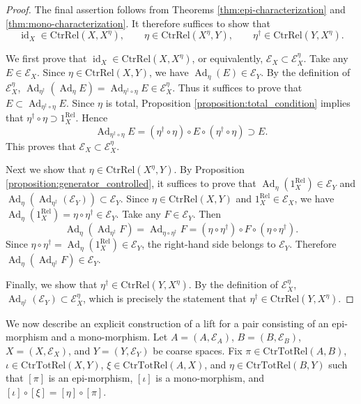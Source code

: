 \documentclass[12pt, a4paper]{amsart}
\theoremstyle{definition}
\newcommand{\Ad}{\mathop{\mathrm{Ad}}\nolimits}
\newcommand{\id}{\mathop{\mathrm{id}}\nolimits}
\newcommand{\Rel}{\mathrm{Rel}}
\newcommand{\CtrTotRel}{\mathrm{CtrTotRel}}
\newcommand{\CtrRel}{\mathrm{CtrRel}}
\begin{document}
\begin{proof}
The final assertion follows from
Theorems \ref{thm:epi-characterization}
and
\ref{thm:mono-characterization}.
It therefore suffices to show that
\[
\id_X \in \CtrRel(X,X^\eta),
\qquad
\eta \in \CtrRel(X^\eta,Y),
\qquad
\eta^\dagger \in \CtrRel(Y,X^\eta).
\]

We first prove that
$\id_X \in \CtrRel(X,X^\eta)$,
or equivalently,
$\mathcal{E}_X \subset \mathcal{E}_X^\eta$.
Take any
$E\in\mathcal{E}_X$.
Since
$\eta\in\CtrRel(X,Y)$,
we have
$\Ad_\eta(E)\in\mathcal{E}_Y$.
By the definition of
$\mathcal{E}_X^\eta$,
$\Ad_{\eta^\dagger}(\Ad_\eta E)
=
\Ad_{\eta^\dagger\circ\eta}E
\in
\mathcal{E}_X^\eta$.
Thus it suffices to prove that
$E\subset \Ad_{\eta^\dagger\circ\eta}E$.
Since
$\eta$
is total,
Proposition \ref{proposition:total_condition}
implies that
$\eta^\dagger\circ\eta
\supset
1_X^{\Rel}$.
Hence
\[
\Ad_{\eta^\dagger\circ\eta}E
=
(\eta^\dagger\circ\eta)
\circ
E
\circ
(\eta^\dagger\circ\eta)
\supset
E.
\]
This proves that
$\mathcal{E}_X\subset\mathcal{E}_X^\eta$.

Next we show that
$\eta\in\CtrRel(X^\eta,Y)$.
By Proposition \ref{proposition:generator_controlled},
it suffices to prove that
$\Ad_\eta(1_X^{\Rel})\in\mathcal{E}_Y$
and
$\Ad_\eta(\Ad_{\eta^\dagger}(\mathcal{E}_Y))
\subset
\mathcal{E}_Y$.
Since
$\eta\in\CtrRel(X,Y)$
and
$1_X^{\Rel}\in\mathcal{E}_X$,
we have
$\Ad_\eta(1_X^{\Rel})
=
\eta\circ\eta^\dagger
\in
\mathcal{E}_Y$.
Take any
$F\in\mathcal{E}_Y$.
Then
\[
\Ad_\eta(\Ad_{\eta^\dagger}F)
=
\Ad_{\eta\circ\eta^\dagger}F
=
(\eta\circ\eta^\dagger)
\circ
F
\circ
(\eta\circ\eta^\dagger).
\]
Since
$\eta\circ\eta^\dagger
=
\Ad_\eta(1_X^{\Rel})
\in
\mathcal{E}_Y$,
the right-hand side belongs to
$\mathcal{E}_Y$.
Therefore
$\Ad_\eta(\Ad_{\eta^\dagger}F)\in\mathcal{E}_Y$.

Finally, we show that
$\eta^\dagger\in\CtrRel(Y,X^\eta)$.
By the definition of
$\mathcal{E}_X^\eta$,
$\Ad_{\eta^\dagger}(\mathcal{E}_Y)
\subset
\mathcal{E}_X^\eta$,
which is precisely the statement that
$\eta^\dagger\in\CtrRel(Y,X^\eta)$.
\end{proof}

We now describe an explicit construction of a lift for a pair consisting of an
epi-morphism and a mono-morphism.
Let
$A=(A,\mathcal{E}_A)$,
$B=(B,\mathcal{E}_B)$,
$X=(X,\mathcal{E}_X)$,
and
$Y=(Y,\mathcal{E}_Y)$
be coarse spaces.
Fix
$\pi\in\CtrTotRel(A,B)$,
$\iota\in\CtrTotRel(X,Y)$,
$\xi\in\CtrTotRel(A,X)$,
and
$\eta\in\CtrTotRel(B,Y)$
such that
$[\pi]$ is an epi-morphism,
$[\iota]$ is a mono-morphism, and
$[\iota]\circ[\xi]=[\eta]\circ[\pi]$.
\end{document}
